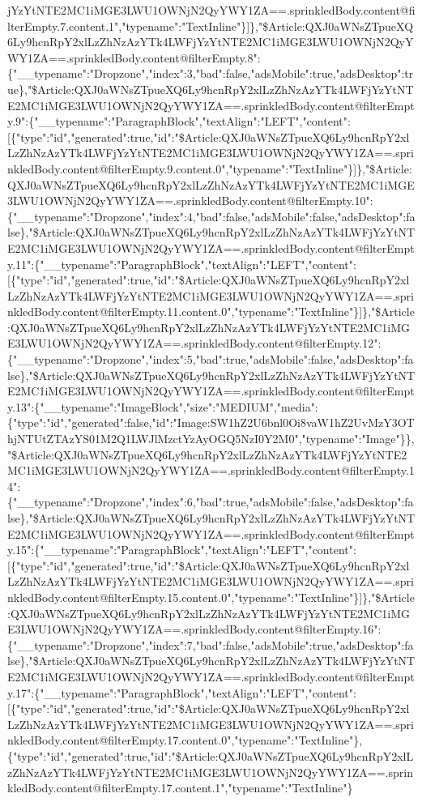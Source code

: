 jYzYtNTE2MC1iMGE3LWU1OWNjN2QyYWY1ZA==.sprinkledBody.content@filterEmpty.7.content.1","typename":"TextInline"\}{]}\},"\$Article:QXJ0aWNsZTpueXQ6Ly9hcnRpY2xlLzZhNzAzYTk4LWFjYzYtNTE2MC1iMGE3LWU1OWNjN2QyYWY1ZA==.sprinkledBody.content@filterEmpty.8":\{"\_\_typename":"Dropzone","index":3,"bad":false,"adsMobile":true,"adsDesktop":true\},"\$Article:QXJ0aWNsZTpueXQ6Ly9hcnRpY2xlLzZhNzAzYTk4LWFjYzYtNTE2MC1iMGE3LWU1OWNjN2QyYWY1ZA==.sprinkledBody.content@filterEmpty.9":\{"\_\_typename":"ParagraphBlock","textAlign":"LEFT","content":{[}\{"type":"id","generated":true,"id":"\$Article:QXJ0aWNsZTpueXQ6Ly9hcnRpY2xlLzZhNzAzYTk4LWFjYzYtNTE2MC1iMGE3LWU1OWNjN2QyYWY1ZA==.sprinkledBody.content@filterEmpty.9.content.0","typename":"TextInline"\}{]}\},"\$Article:QXJ0aWNsZTpueXQ6Ly9hcnRpY2xlLzZhNzAzYTk4LWFjYzYtNTE2MC1iMGE3LWU1OWNjN2QyYWY1ZA==.sprinkledBody.content@filterEmpty.10":\{"\_\_typename":"Dropzone","index":4,"bad":false,"adsMobile":false,"adsDesktop":false\},"\$Article:QXJ0aWNsZTpueXQ6Ly9hcnRpY2xlLzZhNzAzYTk4LWFjYzYtNTE2MC1iMGE3LWU1OWNjN2QyYWY1ZA==.sprinkledBody.content@filterEmpty.11":\{"\_\_typename":"ParagraphBlock","textAlign":"LEFT","content":{[}\{"type":"id","generated":true,"id":"\$Article:QXJ0aWNsZTpueXQ6Ly9hcnRpY2xlLzZhNzAzYTk4LWFjYzYtNTE2MC1iMGE3LWU1OWNjN2QyYWY1ZA==.sprinkledBody.content@filterEmpty.11.content.0","typename":"TextInline"\}{]}\},"\$Article:QXJ0aWNsZTpueXQ6Ly9hcnRpY2xlLzZhNzAzYTk4LWFjYzYtNTE2MC1iMGE3LWU1OWNjN2QyYWY1ZA==.sprinkledBody.content@filterEmpty.12":\{"\_\_typename":"Dropzone","index":5,"bad":true,"adsMobile":false,"adsDesktop":false\},"\$Article:QXJ0aWNsZTpueXQ6Ly9hcnRpY2xlLzZhNzAzYTk4LWFjYzYtNTE2MC1iMGE3LWU1OWNjN2QyYWY1ZA==.sprinkledBody.content@filterEmpty.13":\{"\_\_typename":"ImageBlock","size":"MEDIUM","media":\{"type":"id","generated":false,"id":"Image:SW1hZ2U6bnl0Oi8vaW1hZ2UvMzY3OThjNTUtZTAzYS01M2Q1LWJlMzctYzAyOGQ5NzI0Y2M0","typename":"Image"\}\},"\$Article:QXJ0aWNsZTpueXQ6Ly9hcnRpY2xlLzZhNzAzYTk4LWFjYzYtNTE2MC1iMGE3LWU1OWNjN2QyYWY1ZA==.sprinkledBody.content@filterEmpty.14":\{"\_\_typename":"Dropzone","index":6,"bad":true,"adsMobile":false,"adsDesktop":false\},"\$Article:QXJ0aWNsZTpueXQ6Ly9hcnRpY2xlLzZhNzAzYTk4LWFjYzYtNTE2MC1iMGE3LWU1OWNjN2QyYWY1ZA==.sprinkledBody.content@filterEmpty.15":\{"\_\_typename":"ParagraphBlock","textAlign":"LEFT","content":{[}\{"type":"id","generated":true,"id":"\$Article:QXJ0aWNsZTpueXQ6Ly9hcnRpY2xlLzZhNzAzYTk4LWFjYzYtNTE2MC1iMGE3LWU1OWNjN2QyYWY1ZA==.sprinkledBody.content@filterEmpty.15.content.0","typename":"TextInline"\}{]}\},"\$Article:QXJ0aWNsZTpueXQ6Ly9hcnRpY2xlLzZhNzAzYTk4LWFjYzYtNTE2MC1iMGE3LWU1OWNjN2QyYWY1ZA==.sprinkledBody.content@filterEmpty.16":\{"\_\_typename":"Dropzone","index":7,"bad":false,"adsMobile":true,"adsDesktop":false\},"\$Article:QXJ0aWNsZTpueXQ6Ly9hcnRpY2xlLzZhNzAzYTk4LWFjYzYtNTE2MC1iMGE3LWU1OWNjN2QyYWY1ZA==.sprinkledBody.content@filterEmpty.17":\{"\_\_typename":"ParagraphBlock","textAlign":"LEFT","content":{[}\{"type":"id","generated":true,"id":"\$Article:QXJ0aWNsZTpueXQ6Ly9hcnRpY2xlLzZhNzAzYTk4LWFjYzYtNTE2MC1iMGE3LWU1OWNjN2QyYWY1ZA==.sprinkledBody.content@filterEmpty.17.content.0","typename":"TextInline"\},\{"type":"id","generated":true,"id":"\$Article:QXJ0aWNsZTpueXQ6Ly9hcnRpY2xlLzZhNzAzYTk4LWFjYzYtNTE2MC1iMGE3LWU1OWNjN2QyYWY1ZA==.sprinkledBody.content@filterEmpty.17.content.1","typename":"TextInline"\}